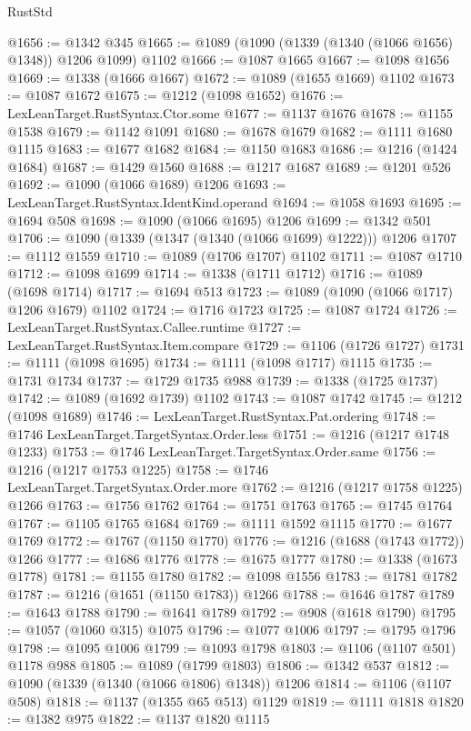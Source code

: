 \begin{lexlean}{RustStd}
\begin{coremodule}
{\begin{coremodule}
{{{{{{{{{{{{{{{{{{{{{{{{{{@1656 := @1342 @345
@1665 := @1089 (@1090 (@1339 (@1340 (@1066 @1656) @1348)) @1206 @1099) @1102
@1666 := @1087 @1665
@1667 := @1098 @1656
@1669 := @1338 (@1666 @1667)
@1672 := @1089 (@1655 @1669) @1102
@1673 := @1087 @1672
@1675 := @1212 (@1098 @1652)
@1676 := LexLeanTarget.RustSyntax.Ctor.some
@1677 := @1137 @1676
@1678 := @1155 @1538
@1679 := @1142 @1091
@1680 := @1678 @1679
@1682 := @1111 @1680 @1115
@1683 := @1677 @1682
@1684 := @1150 @1683
@1686 := @1216 (@1424 @1684)
@1687 := @1429 @1560
@1688 := @1217 @1687
@1689 := @1201 @526
@1692 := @1090 (@1066 @1689) @1206
@1693 := LexLeanTarget.RustSyntax.IdentKind.operand
@1694 := @1058 @1693
@1695 := @1694 @508
@1698 := @1090 (@1066 @1695) @1206
@1699 := @1342 @501
@1706 := @1090 (@1339 (@1347 (@1340 (@1066 @1699) @1222))) @1206
@1707 := @1112 @1559
@1710 := @1089 (@1706 @1707) @1102
@1711 := @1087 @1710
@1712 := @1098 @1699
@1714 := @1338 (@1711 @1712)
@1716 := @1089 (@1698 @1714)
@1717 := @1694 @513
@1723 := @1089 (@1090 (@1066 @1717) @1206 @1679) @1102
@1724 := @1716 @1723
@1725 := @1087 @1724
@1726 := LexLeanTarget.RustSyntax.Callee.runtime
@1727 := LexLeanTarget.RustSyntax.Item.compare
@1729 := @1106 (@1726 @1727)
@1731 := @1111 (@1098 @1695)
@1734 := @1111 (@1098 @1717) @1115
@1735 := @1731 @1734
@1737 := @1729 @1735 @988
@1739 := @1338 (@1725 @1737)
@1742 := @1089 (@1692 @1739) @1102
@1743 := @1087 @1742
@1745 := @1212 (@1098 @1689)
@1746 := LexLeanTarget.RustSyntax.Pat.ordering
@1748 := @1746 LexLeanTarget.TargetSyntax.Order.less
@1751 := @1216 (@1217 @1748 @1233)
@1753 := @1746 LexLeanTarget.TargetSyntax.Order.same
@1756 := @1216 (@1217 @1753 @1225)
@1758 := @1746 LexLeanTarget.TargetSyntax.Order.more
@1762 := @1216 (@1217 @1758 @1225) @1266
@1763 := @1756 @1762
@1764 := @1751 @1763
@1765 := @1745 @1764
@1767 := @1105 @1765 @1684
@1769 := @1111 @1592 @1115
@1770 := @1677 @1769
@1772 := @1767 (@1150 @1770)
@1776 := @1216 (@1688 (@1743 @1772)) @1266
@1777 := @1686 @1776
@1778 := @1675 @1777
@1780 := @1338 (@1673 @1778)
@1781 := @1155 @1780
@1782 := @1098 @1556
@1783 := @1781 @1782
@1787 := @1216 (@1651 (@1150 @1783)) @1266
@1788 := @1646 @1787
@1789 := @1643 @1788
@1790 := @1641 @1789
@1792 := @908 (@1618 @1790)
@1795 := @1057 (@1060 @315) @1075
@1796 := @1077 @1006
@1797 := @1795 @1796
@1798 := @1095 @1006
@1799 := @1093 @1798
@1803 := @1106 (@1107 @501) @1178 @988
@1805 := @1089 (@1799 @1803)
@1806 := @1342 @537
@1812 := @1090 (@1339 (@1340 (@1066 @1806) @1348)) @1206
@1814 := @1106 (@1107 @508)
@1818 := @1137 (@1355 @65 @513) @1129
@1819 := @1111 @1818
@1820 := @1382 @975
@1822 := @1137 @1820 @1115
}}}}}}}}}}}}}}}}}}}}}}}}}}
\end{coremodule}}
\end{coremodule}
\end{lexlean}
